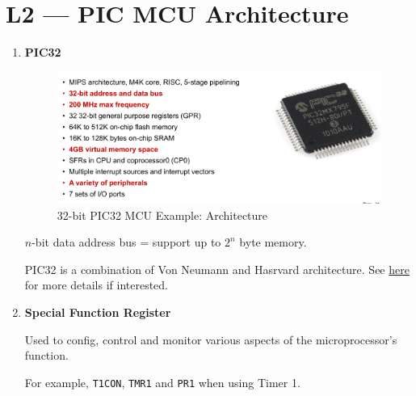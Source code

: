 \documentclass[a4paper]{article}
\begin{document}
\section*{L2 --- PIC MCU Architecture}
  \begin{enumerate}[label = \arabic*.]
    \item \textbf{PIC32}
      \begin{figure}[H]
        \centering
        \includegraphics[width=0.9\linewidth]{PIC32_MCU_Architecture_specification.jpeg}
        \caption{32-bit PIC32 MCU Example: Architecture}
        \label{fig:PIC32_MCU_Architecture_specification.jpeg}
      \end{figure}

      \par \( n \)-bit data address bus = support up to \( 2^n \) byte memory.

      \par PIC32 is a combination of Von Neumann and Hasrvard architecture. See \href{https://blog.flyingpic24.com/2008/10/26/pic32-harvard-or-von-neumann/}{here} for more details if interested.
    \item \textbf{Special Function Register}
      \par Used to config, control and monitor various aspects of the microprocessor's function.
      \par For example, \verb|T1CON|, \verb|TMR1| and \verb|PR1| when using Timer 1.
  \end{enumerate}
\end{document}
